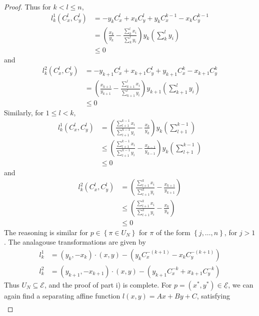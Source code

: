 \documentclass{article}
\theoremstyle{case}
\begin{document}
\begin{proof}
Thus for $k < l \leq n$,
\begin{align*}
l_k^1\left( C_x^l, C_y^l\right) &= -y_kC_x^l + x_kC_y^l + y_kC_x^{k-1} - x_kC_y^{k-1} \\
&= \left( \frac{x_k}{y_k} - \frac{\sum_k^l x_i}{\sum_k^l y_i}\right)y_k\left( \sum_k^l y_i\right) \\
&\leq 0
\end{align*}
and
\begin{align*}
l_k^2\left(C_x^l, C_y^l\right) &= -y_{k+1}C_x^l + x_{k+1}C_y^l + y_{k+1}C_x^k - x_{k+1}C_y^k \\
&= \left( \frac{x_{k+1}}{y_{k+1}} - \frac{\sum_{k+1}^l x_i}{\sum_{k+1}^l y_i}\right)y_{k+1}\left( \sum_{k+1}^l y_i\right) \\
&\leq 0
\end{align*}
Similarly, for $1 \leq l < k$,
\begin{align*}
l_k^1\left( C_x^l, C_y^l\right) &= \left( \frac{\sum_{l+1}^{k-1} x_i}{\sum_{l+1}^{k-1} y_i} - \frac{x_k}{y_k}\right)y_k\left( \sum_{l+1}^{k-1}\right) \\
&\leq \left( \frac{\sum_{l+1}^{k-1} x_i}{\sum_{l+1}^{k-1} y_i} - \frac{x_{k-1}}{y_{k-1}}\right)y_k\left( \sum_{l+1}^{k-1}\right) \\
&\leq 0
\end{align*}
and 
\begin{align*}
l_k^2\left(C_x^l, C_y^l\right) &= \left( \frac{\sum_{l+1}^k x_i}{\sum_{l+1}^k y_i} - \frac{x_{k+1}}{y_{k+1}}\right) \\
&\leq \left( \frac{\sum_{l+1}^k x_i}{\sum_{l+1}^k y_i} - \frac{x_k}{y_k}\right) \\
&\leq 0
\end{align*}
The reasoning is similar for $p \in \left\lbrace \pi \in U_N\right\rbrace$ for $\pi$ of the form $\left\lbrace j, \dots, n\right\rbrace$, for $j > 1$. The analagouse transformations are given by
\begin{align*}
l_k^1 &= \left( y_k, -x_k\right) \cdot \left( x,y\right) - \left( y_kC_x^{-\left(k+1\right)} - x_kC_y^{-\left( k+1\right)}\right) \\
l_k^2 &= \left( y_{k+1}, -x_{k+1}\right) \cdot \left( x,y\right) - \left( y_{k+1}C_x^{-k} + x_{k+1}C_y^{-k}\right)
\end{align*}
Thus $U_N \subseteq \mathcal{E}$, and the proof of part i) is complete.
For $p = \left( x^*, y^* \right) \in \underline{\mathcal{E}}$, we can again find a separating affine function $l\left( x,y\right) = Ax + By + C$, satisfying
\begin{align} \label{eq6}

\end{align}
\end{proof}
\end{document}
